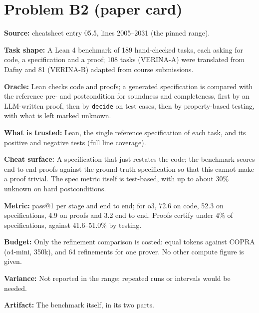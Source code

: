 \documentclass[11pt]{article}
\begin{document}
\section*{Problem B2 (paper card)}\label{ans:B2}
\begin{answer}
\textbf{Source:} cheatsheet entry 05.5, lines 2005--2031 (the pinned range).

\textbf{Task shape:} A Lean 4 benchmark of 189 hand-checked tasks, each asking
for code, a specification and a proof; 108 tasks (VERINA-A) were translated
from Dafny and 81 (VERINA-B) adapted from course submissions.

\textbf{Oracle:} Lean checks code and proofs; a generated specification is
compared with the reference pre- and postcondition for soundness and
completeness, first by an LLM-written proof, then by \texttt{decide} on test
cases, then by property-based testing, with what is left marked unknown.

\textbf{What is trusted:} Lean, the single reference specification of each
task, and its positive and negative tests (full line coverage).

\textbf{Cheat surface:} A specification that just restates the code; the
benchmark scores end-to-end proofs against the ground-truth specification so
that this cannot make a proof trivial. The spec metric itself is test-based,
with up to about 30\% unknown on hard postconditions.

\textbf{Metric:} pass@1 per stage and end to end; for o3, 72.6 on code, 52.3
on specifications, 4.9 on proofs and 3.2 end to end. Proofs certify under 4\%
of specifications, against 41.6--51.0\% by testing.

\textbf{Budget:} Only the refinement comparison is costed: equal tokens
against COPRA (o4-mini, 350k), and 64 refinements for one prover. No other
compute figure is given.

\textbf{Variance:} Not reported in the range; repeated runs or intervals would
be needed.

\textbf{Artifact:} The benchmark itself, in its two parts.
\end{answer}
\end{document}

